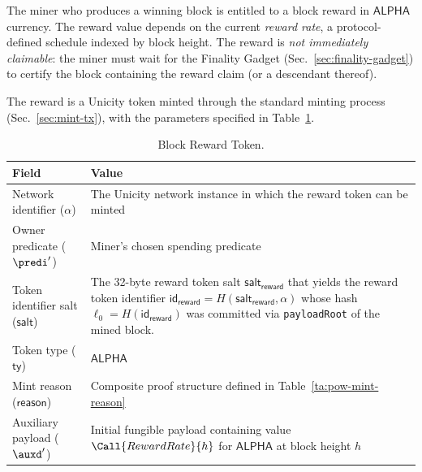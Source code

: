 The miner who produces a winning block is entitled to a block reward in $\mathsf{ALPHA}$ currency. The reward value depends on the current \emph{reward rate}, a protocol-defined schedule indexed by block height. The reward is \emph{not immediately claimable}: the miner must wait for the Finality Gadget (Sec.~\ref{sec:finality-gadget}) to certify the block containing the reward claim (or a descendant thereof).

The reward is a Unicity token minted through the standard minting process (Sec.~\ref{sec:mint-tx}), with the parameters specified in Table~\ref{ta:pow-reward}.

\begin{table}[!htbp]
  \begin{center}
    \caption{Block Reward Token.}\label{ta:pow-reward}
    \begin{tabular}{|p{4cm}|p{9.5cm}|}\hline
      Field & Value \\\hline\hline
      Network identifier ($\alpha$) & The Unicity network instance in which the reward token can be minted \\\hline
      Owner predicate ($\predi'$) & Miner's chosen spending predicate \\\hline
      Token identifier salt ($\mathsf{salt}$) & The 32-byte reward token salt $\mathsf{salt}_\mathsf{reward}$ that yields the reward token identifier $\mathsf{id}_\mathsf{reward} = H(\mathsf{salt}_\mathsf{reward}, \alpha)$ whose hash $\ell_0 = H(\mathsf{id}_\mathsf{reward})$ was committed via \texttt{payloadRoot} of the mined block. \\\hline
      Token type ($\mathsf{ty}$) & $\mathsf{ALPHA}$ \\\hline
      Mint reason ($\mathsf{reason}$) & Composite proof structure defined in Table~\ref{ta:pow-mint-reason} \\\hline
      Auxiliary payload ($\auxd'$) & Initial fungible payload containing value $\Call{RewardRate}{h}$ for $\mathsf{ALPHA}$ at block height $h$ \\\hline
    \end{tabular}
  \end{center}
\end{table}

